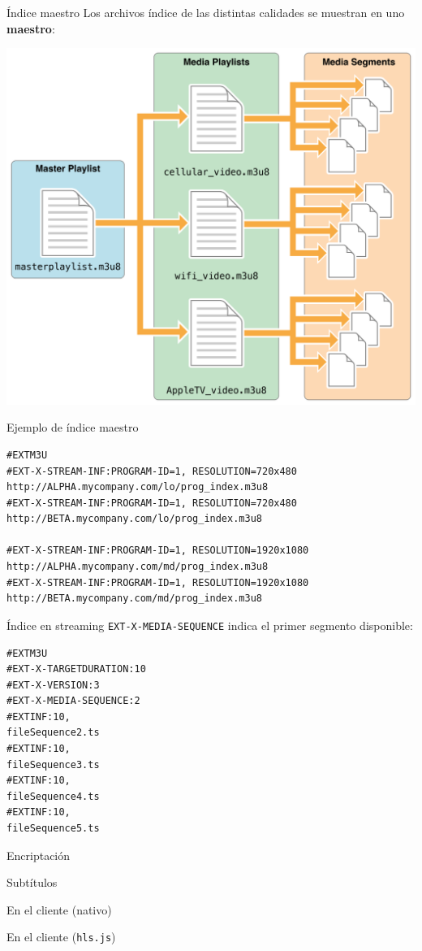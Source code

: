 \documentclass[10pt,compress,usetitleprogressbar,mathserif]{beamer}
\begin{document}
\begin{frame}[fragile]{Índice maestro}
  Los archivos índice de las distintas calidades se muestran en uno \textbf{maestro}:
\begin{center}
\includegraphics[scale=0.17]{img/indiceMaestro.png}
\end{center}
\end{frame}

\begin{frame}[fragile]{Ejemplo de índice maestro}
\begin{lstlisting}
#EXTM3U
#EXT-X-STREAM-INF:PROGRAM-ID=1, RESOLUTION=720x480
http://ALPHA.mycompany.com/lo/prog_index.m3u8
#EXT-X-STREAM-INF:PROGRAM-ID=1, RESOLUTION=720x480
http://BETA.mycompany.com/lo/prog_index.m3u8

#EXT-X-STREAM-INF:PROGRAM-ID=1, RESOLUTION=1920x1080
http://ALPHA.mycompany.com/md/prog_index.m3u8
#EXT-X-STREAM-INF:PROGRAM-ID=1, RESOLUTION=1920x1080
http://BETA.mycompany.com/md/prog_index.m3u8
\end{lstlisting}
\end{frame}

\begin{frame}[fragile]{Índice en streaming}
\texttt{EXT-X-MEDIA-SEQUENCE} indica el primer segmento disponible:

\begin{lstlisting}
#EXTM3U
#EXT-X-TARGETDURATION:10
#EXT-X-VERSION:3
#EXT-X-MEDIA-SEQUENCE:2
#EXTINF:10,
fileSequence2.ts
#EXTINF:10,
fileSequence3.ts
#EXTINF:10,
fileSequence4.ts
#EXTINF:10,
fileSequence5.ts
\end{lstlisting}
\end{frame}

\begin{frame}{Encriptación} %
\end{frame}

\begin{frame}{Subtítulos}
\end{frame}

\begin{frame}{En el cliente (nativo)}
\end{frame}

\begin{frame}{En el cliente (\texttt{hls.js})}
\end{frame}
\end{document}
